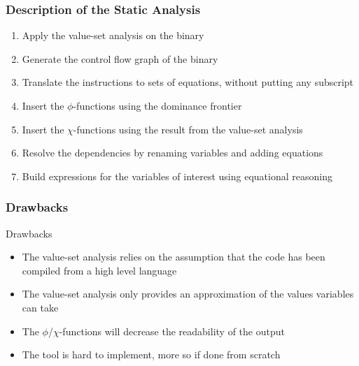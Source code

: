 \documentclass[10pt, xcolor={dvipsnames}]{beamer}
\begin{document}
\begin{frame}
	\frametitle{Description of the Static Analysis}
	\begin{block}{}
		\begin{enumerate}
			\item Apply the value-set analysis on the binary
			\item Generate the control flow graph of the binary
			\item Translate the instructions to sets of equations, without putting any subscript
			\item Insert the $\phi$-functions using the dominance frontier
			\item Insert the $\chi$-functions using the result from the value-set analysis
			\item Resolve the dependencies by renaming variables and adding equations
			\item Build expressions for the variables of interest using equational reasoning
		\end{enumerate}
	\end{block}
\end{frame}

\begin{frame}
	\frametitle{Drawbacks}
	\begin{block}{Drawbacks}
		\begin{itemize}
			\item The value-set analysis relies on the assumption that the code has been compiled from a high level language
			\item The value-set analysis only provides an approximation of the values variables can take
			\item The $\phi$/$\chi$-functions will decrease the readability of the output
			\item The tool is hard to implement, more so if done from scratch
		\end{itemize}
	\end{block}
\end{frame}
\end{document}
